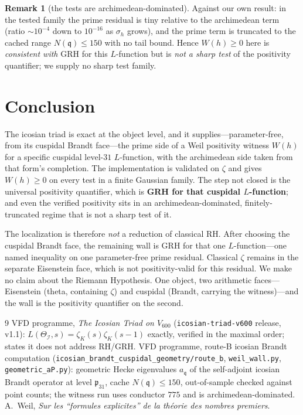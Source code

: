 \documentclass[11pt]{article}
\theoremstyle{definition}
\newtheorem{remark}[theorem]{Remark}
\newcommand{\zetaK}{\zeta_{K}}
\newcommand{\Icos}{\mathcal{I}}
\newcommand{\fq}{\mathfrak{q}}
\begin{document}
\begin{remark}[the tests are archimedean-dominated]
Against our own result: in the tested family the prime residual is tiny relative to the
archimedean term (ratio $\sim10^{-4}$ down to $10^{-16}$ as $\sigma_h$ grows), and the
prime term is truncated to the cached range $N(\fq)\le150$ with no tail bound. Hence
$W(h)\ge0$ here is \emph{consistent with} GRH for this $L$-function but is \emph{not a
sharp test} of the positivity quantifier; we supply no sharp test family.
\end{remark}

\section{Conclusion}
The icosian triad is exact at the object level, and it supplies---parameter-free, from
its cuspidal Brandt face---the prime side of a Weil positivity witness $W(h)$ for a
specific cuspidal level-$31$ $L$-function, with the archimedean side taken from that
form's completion. The implementation is validated on $\zeta$ and gives $W(h)\ge0$ on
every test in a finite Gaussian family. The step not closed is the universal positivity
quantifier, which is \textbf{GRH for that cuspidal $L$-function}; and even the verified
positivity sits in an archimedean-dominated, finitely-truncated regime that is not a
sharp test of it.

The localization is therefore \emph{not} a reduction of classical RH. After choosing the
cuspidal Brandt face, the remaining wall is GRH for that one $L$-function---one named
inequality on one parameter-free prime residual. Classical $\zeta$ remains in the
separate Eisenstein face, which is not positivity-valid for this residual. We make no
claim about the Riemann Hypothesis. One object, two arithmetic faces---Eisenstein (theta,
containing $\zeta$) and cuspidal (Brandt, carrying the witness)---and the wall is the
positivity quantifier on the second.

\begin{thebibliography}{9}
 VFD programme, \emph{The Icosian Triad on $V_{600}$}
  (\texttt{icosian-triad-v600} release, v1.1): $L(\Theta_\Icos,s)=\zetaK(s)\zetaK(s-1)$
  exactly, verified in the maximal order; states it does not address RH/GRH.
 VFD programme, route-B icosian Brandt computation
  (\texttt{icosian\_brandt\_cuspidal\_geometry/route\_b}, \texttt{weil\_wall.py},
  \texttt{geometric\_aP.py}): geometric Hecke eigenvalues $a_\fq$ of the self-adjoint
  icosian Brandt operator at level $\mathfrak p_{31}$, cache $N(\fq)\le150$,
  out-of-sample checked against point counts; the witness run uses conductor $775$ and is
  archimedean-dominated.
 A.~Weil, \emph{Sur les ``formules explicites'' de la th\'eorie des
  nombres premiers}.
\end{thebibliography}
\end{document}
